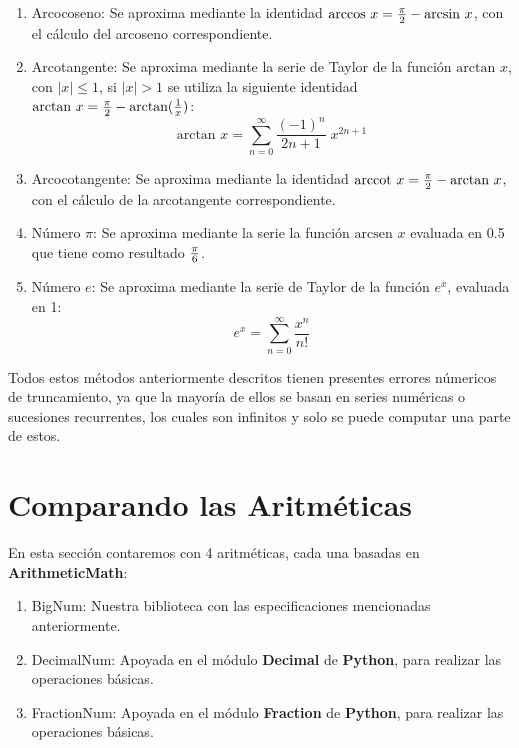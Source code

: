 \documentclass[a4paper,10pt,twocolumn]{article}
\begin{document}
\begin{enumerate}
  		\item Arcocoseno: Se aproxima mediante la identidad $\text{arccos }x={\pi \over 2}-\text{arcsin }x$, con el cálculo del arcoseno correspondiente.
  		
  		\item Arcotangente: Se aproxima mediante la serie de Taylor de la función $\text{arctan }x$, con $|x| \leq 1$, si $|x| > 1$ se utiliza la siguiente identidad $\text{arctan }x={\pi \over 2}-\text{arctan}({1 \over x})$:
  			\begin{equation}
  				\text{arctan }x=\sum _{n=0}^{\infty }{\frac {(-1)^{n}}{2n+1}}\;x^{2n+1}
  			\end{equation}
  			
  		\item Arcocotangente: Se aproxima mediante la identidad $\text{arccot }x={\pi \over 2}-\text{arctan }x$, con el cálculo de la arcotangente correspondiente.
  		
  		\item Número $\pi$: Se aproxima mediante la serie la función $\text{arcsen }x$ evaluada en 0.5 que tiene como resultado $\pi\over 6$.
  		
  		\item Número $e$: Se aproxima mediante la serie de Taylor de la función $e^x$, evaluada en 1:
  			\begin{equation}
  				e^{x}=\sum _{n=0}^{\infty }{\frac {x^{n}}{n!}}
  			\end{equation}
  	\end{enumerate}
  			
  	Todos estos métodos anteriormente descritos tienen presentes errores númericos de truncamiento, ya que la mayoría de ellos se basan en series numéricas o sucesiones recurrentes, los cuales son infinitos y solo se puede computar una parte de estos.
	

\section{Comparando las Aritméticas}\label{sub:comp_aritmetics}
	En esta sección contaremos con 4 aritméticas, cada una basadas en \textbf{ArithmeticMath}:
	\begin{enumerate}
		\item BigNum: Nuestra biblioteca con las especificaciones mencionadas anteriormente.
		
		\item DecimalNum: Apoyada en el módulo \textbf{Decimal} de \textbf{Python}, para realizar las operaciones básicas.
		
		\item FractionNum: Apoyada en el módulo \textbf{Fraction} de \textbf{Python}, para realizar las operaciones básicas. 
	\end{enumerate}
\end{document}
